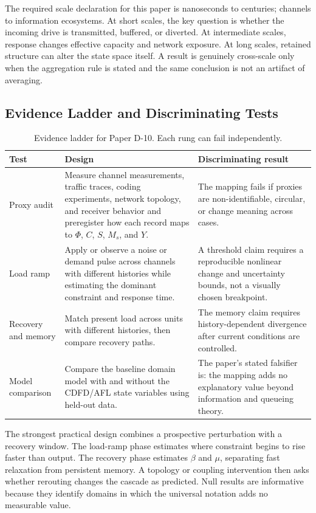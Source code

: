\documentclass[12pt,a4paper]{article}
\begin{document}
The required scale declaration for this paper is nanoseconds to centuries; channels to information ecosystems. At short
scales, the key question is whether the incoming drive is transmitted,
buffered, or diverted. At intermediate scales, response changes effective
capacity and network exposure. At long scales, retained structure can alter the
state space itself. A result is genuinely cross-scale only when the aggregation
rule is stated and the same conclusion is not an artifact of averaging.

\subsection{Evidence Ladder and Discriminating Tests}

\begin{table}[htbp]
\centering
\small
\caption{Evidence ladder for Paper D-10. Each rung can fail independently.}
\begin{tabularx}{\textwidth}{|p{}|X|X|}
\hline
\textbf{Test} & \textbf{Design} & \textbf{Discriminating result} \\
\hline
Proxy audit & Measure channel measurements, traffic traces, coding experiments, network topology, and receiver behavior and preregister how each record maps to $\Phi$, $C$, $S$, $M_s$, and $Y$. & The mapping fails if proxies are non-identifiable, circular, or change meaning across cases. \\
\hline
Load ramp & Apply or observe a noise or demand pulse across channels with different histories while estimating the dominant constraint and response time. & A threshold claim requires a reproducible nonlinear change and uncertainty bounds, not a visually chosen breakpoint. \\
\hline
Recovery and memory & Match present load across units with different histories, then compare recovery paths. & The memory claim requires history-dependent divergence after current conditions are controlled. \\
\hline
Model comparison & Compare the baseline domain model with and without the CDFD/AFL state variables using held-out data. & The paper's stated falsifier is: the mapping adds no explanatory value beyond information and queueing theory. \\
\hline
\end{tabularx}
\end{table}

The strongest practical design combines a prospective perturbation with a
recovery window. The load-ramp phase estimates where constraint begins to rise
faster than output. The recovery phase estimates $\beta$ and $\mu$, separating
fast relaxation from persistent memory. A topology or coupling intervention
then asks whether rerouting changes the cascade as predicted. Null results are
informative because they identify domains in which the universal notation adds
no measurable value.
\end{document}

